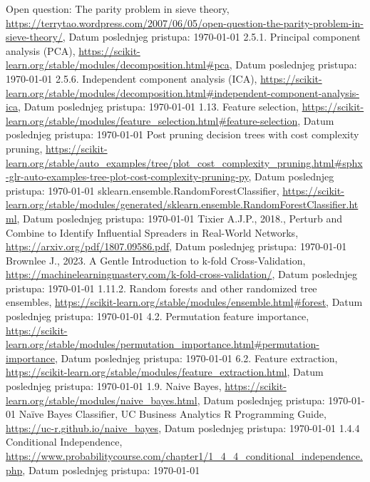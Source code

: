 \documentclass[fontsize=12bp, paper=a4]{scrarticle}
\begin{document}
\begin{thebibliography}{1}
     Open question: The parity problem in sieve theory, \url{https://terrytao.wordpress.com/2007/06/05/open-question-the-parity-problem-in-sieve-theory/}, Datum poslednjeg pristupa: \today
     2.5.1. Principal component analysis (PCA), \url{https://scikit-learn.org/stable/modules/decomposition.html#pca}, Datum poslednjeg pristupa: \today
     2.5.6. Independent component analysis (ICA), \url{https://scikit-learn.org/stable/modules/decomposition.html#independent-component-analysis-ica}, Datum poslednjeg pristupa: \today
     1.13. Feature selection, \url{https://scikit-learn.org/stable/modules/feature_selection.html#feature-selection}, Datum poslednjeg pristupa: \today
     Post pruning decision trees with cost complexity pruning, \url{https://scikit-learn.org/stable/auto_examples/tree/plot_cost_complexity_pruning.html#sphx-glr-auto-examples-tree-plot-cost-complexity-pruning-py}, Datum poslednjeg pristupa: \today
     sklearn.ensemble.RandomForestClassifier, \url{https://scikit-learn.org/stable/modules/generated/sklearn.ensemble.RandomForestClassifier.html}, Datum poslednjeg pristupa: \today
     Tixier A.J.P., 2018., Perturb and Combine to Identify Influential
Spreaders in Real-World Networks, \url{https://arxiv.org/pdf/1807.09586.pdf}, Datum poslednjeg pristupa: \today
    Brownlee J., 2023. A Gentle Introduction to k-fold Cross-Validation, \url{https://machinelearningmastery.com/k-fold-cross-validation/}, Datum poslednjeg pristupa: \today
    1.11.2. Random forests and other randomized tree ensembles, \url{https://scikit-learn.org/stable/modules/ensemble.html#forest}, Datum poslednjeg pristupa: \today
    4.2. Permutation feature importance, \url{https://scikit-learn.org/stable/modules/permutation_importance.html#permutation-importance}, Datum poslednjeg pristupa: \today
    6.2. Feature extraction, \url{https://scikit-learn.org/stable/modules/feature_extraction.html}, Datum poslednjeg pristupa: \today
    1.9. Naive Bayes, \url{https://scikit-learn.org/stable/modules/naive_bayes.html}, Datum poslednjeg pristupa: \today
    Naïve Bayes Classifier, UC Business Analytics R Programming Guide, \url{https://uc-r.github.io/naive_bayes}, Datum poslednjeg pristupa: \today
    1.4.4 Conditional Independence, \url{https://www.probabilitycourse.com/chapter1/1_4_4_conditional_independence.php}, Datum poslednjeg pristupa: \today

\end{thebibliography}
\end{document}
